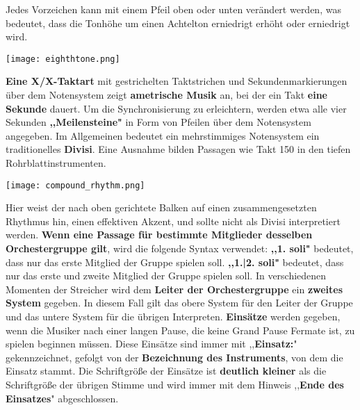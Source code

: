 \documentclass[12pt]{article}
\newcommand*\circled[1]{\tikz[baseline=(char.base)]{
            \node[shape=circle,draw,inner sep=1pt] (char) {#1};}}
\begin{document}
\begingroup
\circled{3} Jedes Vorzeichen kann mit einem Pfeil oben oder unten verändert werden, was bedeutet, dass die Tonhöhe um einen Achtelton erniedrigt erhöht oder erniedrigt wird. \\
\begin{center}
\texttt{[image: eighthtone.png]}
\end{center}
\endgroup

\begingroup
\textbf{\circled{11} Eine X/X-Taktart} mit gestrichelten Taktstrichen und Sekundenmarkierungen über dem Notensystem zeigt \textbf{ametrische Musik} an, bei der ein Takt \textbf{eine Sekunde} dauert. Um die Synchronisierung zu erleichtern, werden etwa alle vier Sekunden \textbf{,,Meilensteine"} in Form von Pfeilen über dem Notensystem angegeben. \textbf{\circled{12}}  Im Allgemeinen bedeutet ein mehrstimmiges Notensystem ein traditionelles \textbf{Divisi}. Eine Ausnahme bilden Passagen wie Takt 150 in den tiefen Rohrblattinstrumenten. \\
\begin{center}
\texttt{[image: compound\_rhythm.png]}
\end{center}
Hier weist der nach oben gerichtete Balken auf einen zusammengesetzten Rhythmus hin, einen effektiven Akzent, und sollte nicht als Divisi interpretiert werden. \textbf{\circled{13} Wenn eine Passage für bestimmte Mitglieder desselben Orchestergruppe gilt}, wird die folgende Syntax verwendet: \textbf{,,1. soli"} bedeutet, dass nur das erste Mitglied der Gruppe spielen soll. \textbf{,,1.|2. soli"} bedeutet, dass nur das erste und zweite Mitglied der Gruppe spielen soll. In verschiedenen Momenten der Streicher wird dem \textbf{Leiter der Orchestergruppe} ein \textbf{zweites System} gegeben. In diesem Fall gilt das obere System für den Leiter der Gruppe und das untere System für die übrigen Interpreten. \textbf{\circled{14} Einsätze} werden gegeben, wenn die Musiker nach einer langen Pause, die keine Grand Pause Fermate ist, zu spielen beginnen müssen. Diese Einsätze sind immer mit ,,\textbf{Einsatz:}" gekennzeichnet, gefolgt von der \textbf{Bezeichnung des Instruments}, von dem die Einsatz stammt. Die Schriftgröße der Einsätze ist \textbf{deutlich kleiner} als die Schriftgröße der übrigen Stimme und wird immer mit dem Hinweis ,,\textbf{Ende des Einsatzes}" abgeschlossen.
\endgroup
\end{document}
